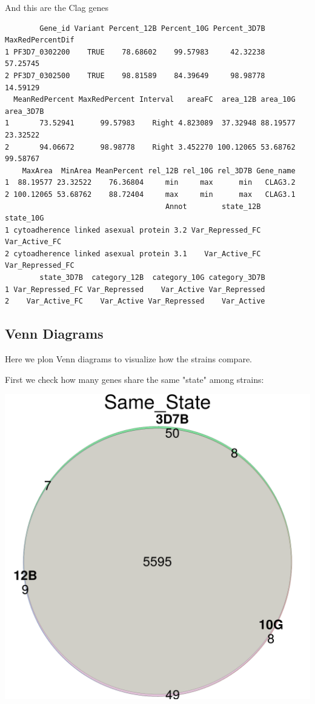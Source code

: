 \documentclass[11pt]{article}
\begin{document}
And this are the Clag genes
\begin{verbatim}
        Gene_id Variant Percent_12B Percent_10G Percent_3D7B MaxRedPercentDif
1 PF3D7_0302200    TRUE    78.68602    99.57983     42.32238         57.25745
2 PF3D7_0302500    TRUE    98.81589    84.39649     98.98778         14.59129
  MeanRedPercent MaxRedPercent Interval   areaFC  area_12B area_10G area_3D7B
1       73.52941      99.57983    Right 4.823089  37.32948 88.19577  23.32522
2       94.06672      98.98778    Right 3.452270 100.12065 53.68762  99.58767
    MaxArea  MinArea MeanPercent rel_12B rel_10G rel_3D7B Gene_name
1  88.19577 23.32522    76.36804     min     max      min   CLAG3.2
2 100.12065 53.68762    88.72404     max     min      max   CLAG3.1
                                     Annot        state_12B        state_10G
1 cytoadherence linked asexual protein 3.2 Var_Repressed_FC    Var_Active_FC
2 cytoadherence linked asexual protein 3.1    Var_Active_FC Var_Repressed_FC
        state_3D7B  category_12B  category_10G category_3D7B
1 Var_Repressed_FC Var_Repressed    Var_Active Var_Repressed
2    Var_Active_FC    Var_Active Var_Repressed    Var_Active
\end{verbatim}

\subsection{Venn Diagrams}
\label{sec:orgde82d5d}
Here we plon Venn diagrams to visualize how the strains compare.

First we check how many genes share the same "state" among strains:

\begin{center}
\includegraphics[width=.9\linewidth]{./Plots/venn_Same_State.png}
\end{center}
\end{document}
